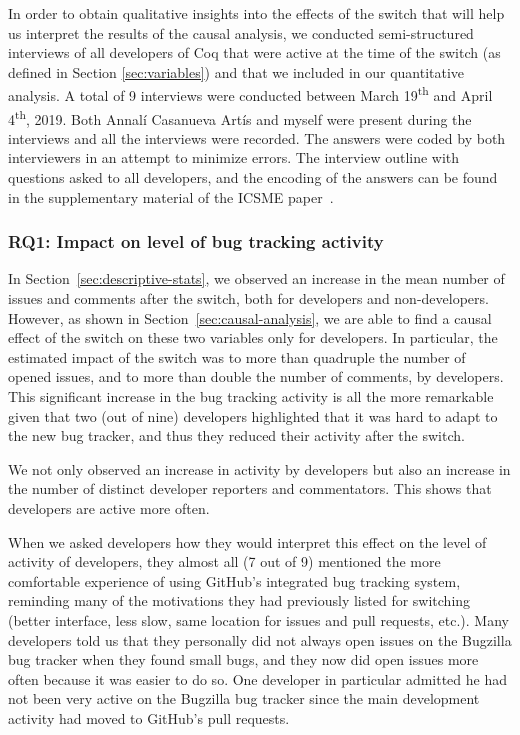 In order to obtain qualitative insights into the effects of the switch that will help us interpret the results of the causal analysis, we conducted semi-structured interviews of all developers of Coq that were active at the time of the switch (as defined in Section \ref{sec:variables}) and that we included in our quantitative analysis.
A total of 9 interviews were conducted between March 19\textsuperscript{th} and April 4\textsuperscript{th}, 2019.
Both Annal\'i Casanueva Art\'is and myself were present during the interviews and all the interviews were recorded.
The answers were coded by both interviewers in an attempt to minimize errors.
The interview outline with questions asked to all developers, and the encoding of the answers can be found in the supplementary material of the ICSME paper~\cite{zimmermann2019supplementary}.

\subsubsection{RQ1: Impact on level of bug tracking activity}

In Section~\ref{sec:descriptive-stats}, we observed an increase in the mean number of issues and comments after the switch, both for developers and non-developers.
However, as shown in Section~\ref{sec:causal-analysis}, we are able to find a causal effect of the switch on these two variables only for developers.
In particular, the estimated impact of the switch was to more than quadruple the number of opened issues, and to more than double the number of comments, by developers.
This significant increase in the bug tracking activity is all the more remarkable given that two (out of nine) developers highlighted that it was hard to adapt to the new bug tracker, and thus they reduced their activity after the switch.

We not only observed an increase in activity by developers but also an increase in the number of distinct developer reporters and commentators. This shows that developers are active more often.

When we asked developers how they would interpret this effect on the level of activity of developers, they almost all (7 out of 9) mentioned the more comfortable experience of using GitHub's integrated bug tracking system, reminding many of the motivations they had previously listed for switching (better interface, less slow, same location for issues and pull requests, etc.). Many developers told us that they personally did not always open issues on the Bugzilla bug tracker when they found small bugs, and they now did open issues more often because it was easier to do so. One developer in particular admitted he had not been very active on the Bugzilla bug tracker since the main development activity had moved to GitHub's pull requests.

